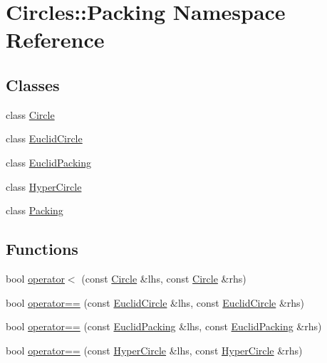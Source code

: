 \hypertarget{namespace_circles_1_1_packing}{}\section{Circles\+:\+:Packing Namespace Reference}
\label{namespace_circles_1_1_packing}
\subsection*{Classes}
\begin{DoxyCompactItemize}
\item 
class \hyperlink{class_circles_1_1_packing_1_1_circle}{Circle}
\item 
class \hyperlink{class_circles_1_1_packing_1_1_euclid_circle}{Euclid\+Circle}
\item 
class \hyperlink{class_circles_1_1_packing_1_1_euclid_packing}{Euclid\+Packing}
\item 
class \hyperlink{class_circles_1_1_packing_1_1_hyper_circle}{Hyper\+Circle}
\item 
class \hyperlink{class_circles_1_1_packing_1_1_packing}{Packing}
\end{DoxyCompactItemize}
\subsection*{Functions}
\begin{DoxyCompactItemize}
\item 
bool \hyperlink{namespace_circles_1_1_packing_a372a7d94ba42f1b7ce411fd596a29710}{operator$<$} (const \hyperlink{class_circles_1_1_packing_1_1_circle}{Circle} \&lhs, const \hyperlink{class_circles_1_1_packing_1_1_circle}{Circle} \&rhs)
\item 
bool \hyperlink{namespace_circles_1_1_packing_a2fcf53805f473b2c72013862fb4d87e5}{operator==} (const \hyperlink{class_circles_1_1_packing_1_1_euclid_circle}{Euclid\+Circle} \&lhs, const \hyperlink{class_circles_1_1_packing_1_1_euclid_circle}{Euclid\+Circle} \&rhs)
\item 
bool \hyperlink{namespace_circles_1_1_packing_a5402e12c62a4df8559e587b37946f27e}{operator==} (const \hyperlink{class_circles_1_1_packing_1_1_euclid_packing}{Euclid\+Packing} \&lhs, const \hyperlink{class_circles_1_1_packing_1_1_euclid_packing}{Euclid\+Packing} \&rhs)
\item 
bool \hyperlink{namespace_circles_1_1_packing_a738f85099f6b67e70d184f133800f814}{operator==} (const \hyperlink{class_circles_1_1_packing_1_1_hyper_circle}{Hyper\+Circle} \&lhs, const \hyperlink{class_circles_1_1_packing_1_1_hyper_circle}{Hyper\+Circle} \&rhs)
\end{DoxyCompactItemize}


